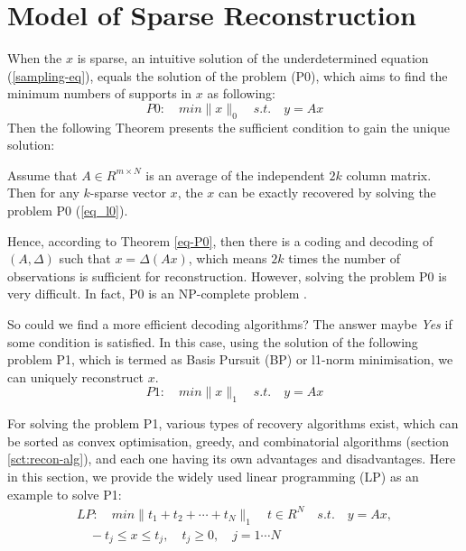 \section{Model of Sparse Reconstruction}

When the $x$ is sparse, an intuitive solution of the underdetermined equation (\ref{sampling-eq}), equals the solution of the problem (P0), which aims to find the minimum numbers of supports in $x$ as following:
\begin{equation}
\label{eq_l0}
P0: \quad min \| x \|_0 \quad s.t. \quad y = Ax
\end{equation}
Then the following Theorem presents the sufficient condition to gain the unique solution:
\begin{theorem}
\label{eq-P0}
Assume that $A \in R^{m \times N}$ is an average of the independent $2k$ column matrix. Then for any $k$-sparse vector $x$, the $x$ can be exactly recovered by solving the problem P0 (\ref{eq_l0}).
\end{theorem}
Hence, according to Theorem \ref{eq-P0}, then there is a coding and decoding of $(A, \Delta)$ such that $x = \Delta(Ax)$, which means $2k$ times the number of observations is sufficient for reconstruction. However, solving the problem P0 is very difficult. In fact, P0 is an NP-complete problem \cite{davis1997adaptive}.

So could we find a more efficient decoding algorithms? The answer maybe \emph{Yes} if some condition is satisfied. In this case, using the solution of the following problem P1, which is termed as Basis Pursuit (BP) or l1-norm minimisation, we can uniquely reconstruct $x$.
\begin{equation}
\label{eq_l1}
P1: \quad min \| x \|_1 \quad s.t. \quad y = Ax
\end{equation}

For solving the problem P1, various types of recovery algorithms exist, which can be sorted as convex optimisation, greedy, and combinatorial algorithms (section \ref{sct:recon-alg}), and each one having its own advantages and disadvantages. Here in this section, we provide the widely used linear programming (LP) as an example to solve P1:
\begin{equation}
\begin{split}
LP: \quad min \| t_1 + t_2 + \cdots + t_N \|_1 \quad t \in R^N\quad s.t. \quad y = Ax, \\
\quad -t_j \leq x \leq t_j, \quad t_j \geq 0, \quad j = 1 \cdots N
\end{split}
\end{equation}

